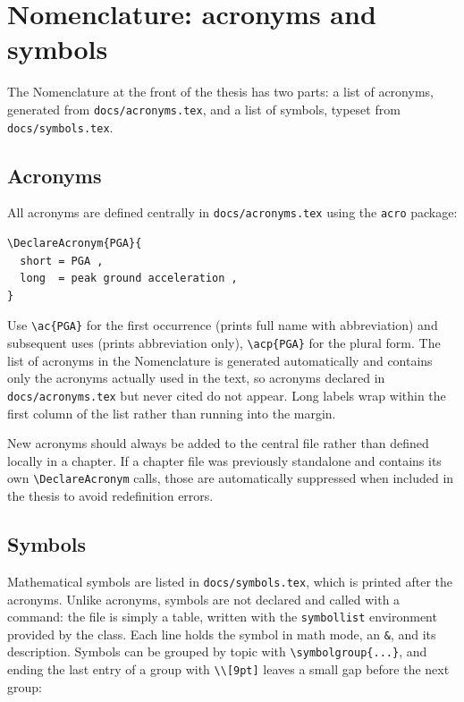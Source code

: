 \section{Nomenclature: acronyms and symbols}

The Nomenclature at the front of the thesis has two parts: a list of acronyms, generated from \texttt{docs/acronyms.tex}, and a list of symbols, typeset from \texttt{docs/symbols.tex}.

\subsection{Acronyms}

All acronyms are defined centrally in \texttt{docs/acronyms.tex} using the \texttt{acro} package:

\begin{verbatim}
\DeclareAcronym{PGA}{
  short = PGA ,
  long  = peak ground acceleration ,
}
\end{verbatim}

Use \verb|\ac{PGA}| for the first occurrence (prints full name with abbreviation) and subsequent uses (prints abbreviation only), \verb|\acp{PGA}| for the plural form. The list of acronyms in the Nomenclature is generated automatically and contains only the acronyms actually used in the text, so acronyms declared in \texttt{docs/acronyms.tex} but never cited do not appear. Long labels wrap within the first column of the list rather than running into the margin.

New acronyms should always be added to the central file rather than defined locally in a chapter. If a chapter file was previously standalone and contains its own \verb|\DeclareAcronym| calls, those are automatically suppressed when included in the thesis to avoid redefinition errors.

\subsection{Symbols}

Mathematical symbols are listed in \texttt{docs/symbols.tex}, which is printed after the acronyms. Unlike acronyms, symbols are not declared and called with a command: the file is simply a table, written with the \texttt{symbollist} environment provided by the class. Each line holds the symbol in math mode, an \verb|&|, and its description. Symbols can be grouped by topic with \verb|\symbolgroup{...}|, and ending the last entry of a group with \verb|\\[9pt]| leaves a small gap before the next group:

